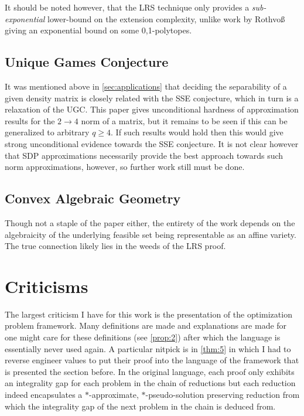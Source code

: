 \documentclass[runningheads,a4paper,english]{llncs}[2022/01/12]
\begin{document}
It should be noted however, that the LRS technique only provides a \emph{sub-exponential} lower-bound on the extension complexity, unlike work by Rothvo\ss\, giving an exponential bound \cite{rothvoss2013some} on some 0,1-polytopes.

\subsection{Unique Games Conjecture}
It was mentioned above in \cref{sec:applications} that deciding the separability of a given density matrix is closely related with the SSE conjecture, which in turn is a relaxation of the UGC.
This paper gives unconditional hardness of approximation results for the $2\to 4$ norm of a matrix, but it remains to be seen if this can be generalized to arbitrary $q \ge 4$.
If such results would hold then this would give strong unconditional evidence towards the SSE conjecture.
It is not clear however that SDP approximations necessarily provide the best approach towards such norm approximations, however, so further work still must be done.

\subsection{Convex Algebraic Geometry}
Though not a staple of the paper either, the entirety of the work depends on the algebraicity of the underlying feasible set being representable as an affine variety.
The true connection likely lies in the weeds of the LRS proof.

\section{Criticisms}
\label{sec:criticisms}
The largest criticism I have for this work is the presentation of the optimization problem framework.
Many definitions are made and explanations are made for one might care for these definitions (see \cref{prop:2}) after which the language is essentially never used again.
A particular nitpick is in \cref{thm:5} in which I had to reverse engineer values to put their proof into the language of the framework that is presented the section before.
In the original language, each proof only exhibits an integrality gap for each problem in the chain of reductions but each reduction indeed encapsulates a $*$-approximate, $*$-pseudo-solution preserving reduction from which the integrality gap of the next problem in the chain is deduced from.
\end{document}
